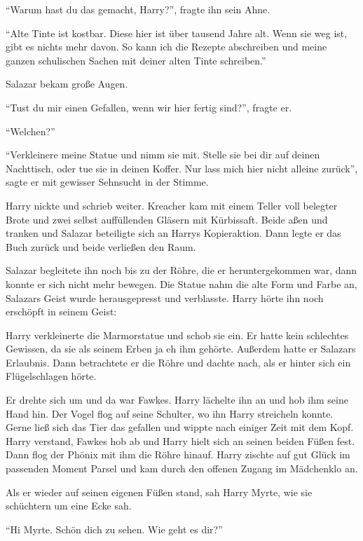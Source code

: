 \enquote{Warum hast du das gemacht, Harry?}, fragte ihn sein Ahne.

\enquote{Alte Tinte ist kostbar. Diese hier ist über tausend Jahre alt. Wenn sie weg ist, gibt es nichts mehr davon. So kann ich die Rezepte abschreiben und meine ganzen schulischen Sachen mit deiner alten Tinte schreiben.}

Salazar bekam große Augen.

\enquote{Tust du mir einen Gefallen, wenn wir hier fertig sind?}, fragte er.

\enquote{Welchen?}

\enquote{Verkleinere meine Statue und nimm sie mit. Stelle sie bei dir auf deinen Nachttisch, oder tue sie in deinen Koffer. Nur lass mich hier nicht alleine zurück}, sagte er mit gewisser Sehnsucht in der Stimme.

Harry nickte und schrieb weiter. Kreacher kam mit einem Teller voll belegter Brote und zwei selbst auffüllenden Gläsern mit Kürbissaft. Beide aßen und tranken und Salazar beteiligte sich an Harrys Kopieraktion. Dann legte er das Buch zurück und beide verließen den Raum.

Salazar begleitete ihn noch bis zu der Röhre, die er heruntergekommen war, dann konnte er sich nicht mehr bewegen. Die Statue nahm die alte Form und Farbe an, Salazars Geist wurde herausgepresst und verblasste. Harry hörte ihn noch erschöpft in seinem Geist: 

Harry verkleinerte die Marmorstatue und schob sie ein. Er hatte kein schlechtes Gewissen, da sie als seinem Erben ja eh ihm gehörte. Außerdem hatte er Salazars Erlaubnis. Dann betrachtete er die Röhre und dachte nach, als er hinter sich ein Flügelschlagen hörte.

Er drehte sich um und da war Fawkes. Harry lächelte ihn an und hob ihm seine Hand hin. Der Vogel flog auf seine Schulter, wo ihn Harry streicheln konnte. Gerne ließ sich das Tier das gefallen und wippte nach einiger Zeit mit dem Kopf. Harry verstand, Fawkes hob ab und Harry hielt sich an seinen beiden Füßen fest. Dann flog der Phönix mit ihm die Röhre hinauf. Harry zischte auf gut Glück im passenden Moment Parsel und kam durch den offenen Zugang im Mädchenklo an.

Als er wieder auf seinen eigenen Füßen stand, sah Harry Myrte, wie sie schüchtern um eine Ecke sah.

\enquote{Hi Myrte. Schön dich zu sehen. Wie geht es dir?}

